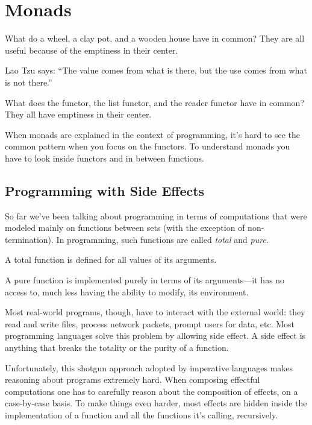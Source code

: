 \documentclass[DaoFP]{subfiles}
\begin{document}
\setcounter{chapter}{13}

\chapter{Monads}

What do a wheel, a clay pot, and a wooden house have in common? They are all useful because of the emptiness in their center. 

Lao Tzu says: ``The value comes from what is there, but the use comes from what is not there.''

What does the  functor, the list functor, and the reader functor have in common? They all have emptiness in their center. 

When monads are explained in the context of programming, it's hard to see the common pattern when you focus on the functors. To understand monads you have to look inside functors and in between functions.



\section{Programming with Side Effects}

So far we've been talking about programming in terms of computations that were modeled mainly on functions between sets (with the exception of non-termination). In programming, such functions are called \emph{total} and \emph{pure}. 

A total function is defined for all values of its arguments. 

A pure function is implemented purely in terms of its arguments---it has no access to, much less having the ability to modify, its environment. 

Most real-world programs, though, have to interact with the external world: they read and write files, process network packets, prompt users for data, etc. Most programming languages solve this problem by allowing side effect. A side effect is anything that breaks the totality or the purity of a function. 

Unfortunately, this shotgun approach adopted by imperative languages makes reasoning about programs extremely hard. When composing effectful computations one has to carefully reason about the composition of effects, on a case-by-case basis. To make things even harder, most effects are hidden inside the implementation of a function and all the functions it's calling, recursively.
\end{document}
